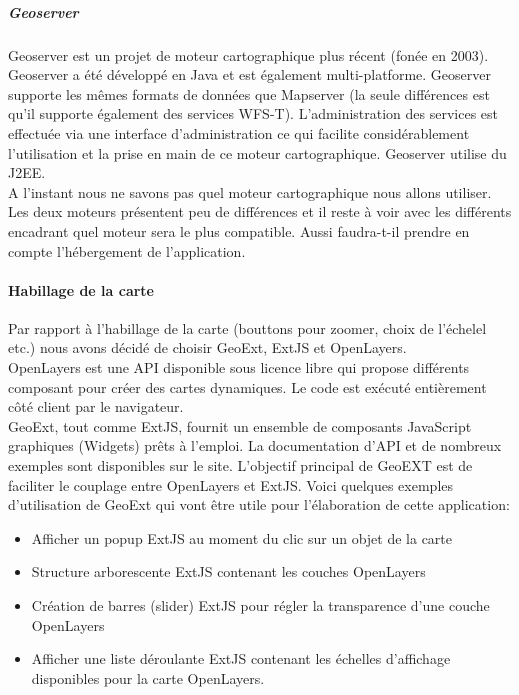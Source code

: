 \subparagraph{Geoserver}
Geoserver est un projet de moteur cartographique plus récent (fonée en 2003). Geoserver a été développé en Java et est également multi-platforme. Geoserver supporte les mêmes formats de données que Mapserver (la seule différences est qu'il supporte également des services WFS-T). L'administration des services est effectuée via une interface d'administration ce qui facilite considérablement l'utilisation et la prise en main de ce moteur cartographique. Geoserver utilise du J2EE. \\


A l'instant nous ne savons pas quel moteur cartographique nous allons utiliser. Les deux moteurs présentent peu de différences et il reste à voir avec les différents encadrant quel moteur sera le plus compatible. Aussi faudra-t-il prendre en compte l'hébergement de l'application. \\

\paragraph{Habillage de la carte}

Par rapport à l'habillage de la carte (bouttons pour zoomer, choix de l'échelel etc.) nous avons décidé de choisir GeoExt, ExtJS et OpenLayers. \\

OpenLayers est une API disponible sous licence libre qui propose différents composant pour créer des cartes dynamiques. Le code est exécuté entièrement côté client par le navigateur.\\

GeoExt, tout comme ExtJS, fournit un ensemble de composants JavaScript graphiques (Widgets) prêts à l’emploi. La documentation d'API et de nombreux exemples sont disponibles sur le site. L'objectif principal de GeoEXT est de faciliter le couplage entre OpenLayers et ExtJS. Voici quelques exemples d'utilisation de GeoExt qui vont être utile pour l'élaboration de cette application: 

\begin{itemize}
\item Afficher un popup ExtJS au moment du clic sur un objet de la carte
\item Structure arborescente ExtJS contenant les couches OpenLayers
\item Création de barres (slider) ExtJS pour régler la transparence d'une couche OpenLayers
\item Afficher une liste déroulante ExtJS contenant les échelles d'affichage disponibles pour la carte OpenLayers.
\end{itemize}

